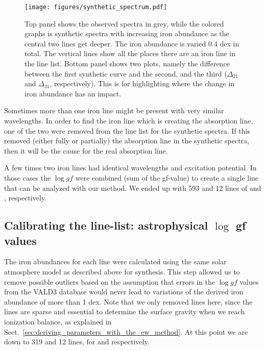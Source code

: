 \documentclass{aa}
\begin{document}
\begin{figure}[tpb]
    \centering
    \texttt{[image: figures/synthetic\_spectrum.pdf]}
    \caption{Top panel shows the observed spectra in grey, while
        the colored graphs is synthetic spectra with increasing iron
        abundance as the central two lines get deeper. The iron abundance
        is varied 0.4 dex in total. The vertical lines show all the places
        there are an iron line in the line list. Bottom panel shows
        two plots, namely the difference between the first synthetic curve
        and the second, and the third ($\Delta_{21}$ and $\Delta_{31}$,
        respectively). This is for highlighting where the change in iron
        abundance has an impact.}
    \label{fig:synthesis}
\end{figure}


Sometimes more than one iron line might be present with very similar
wavelengths. In order to find the iron line which is creating the
absorption line, one of the two were removed from the line list for
the synthetic spectra. If this removed (either fully or partially) the
absorption line in the synthetic spectra, then it will be the cause for
the real absorption line.

A few times two iron lines had identical wavelengths and excitation
potential. In those cases the $\log \mathit{gf}$ were combined (sum
of the gf-value) to create a single line that can be analyzed with
our method. We ended up with 593 and 12 lines of  and
, respectively.


\subsection{Calibrating the line-list: astrophysical $\log$ gf values}
\label{ssub:Recalibrating-the-atomic-data}

The iron abundances for each line were calculated using the same
solar atmosphere model as described above for synthesis. This step
allowed us to remove possible outliers based on the assumption that
errors in the $\log \mathit{gf}$ values from the VALD3 database
would never lead to variations of the derived iron abundance of more
than 1 dex. Note that we only removed  lines here, since
the  lines are sparse and essential to determine the
surface gravity when we reach ionization balance, as explained in
Sect.~\ref{sec:deriving_parameters_with_the_ew_method}. At this point
we are down to 319 and 12 lines, for  and 
respectively.
\end{document}
